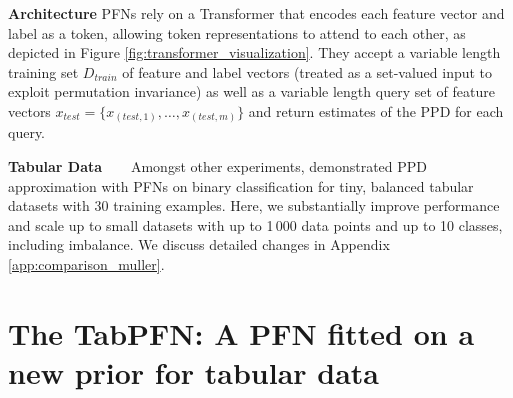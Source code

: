 \documentclass{article}
\newcommand{\slimparagraph}[1]{\textbf{#1~~~}}
\begin{document}
\textbf{Architecture} 
PFNs rely on a Transformer \citep{vaswani-neurips17a} that encodes each feature vector and label as a token, allowing token representations to attend to each other, as depicted in Figure \ref{fig:transformer_visualization}.
They accept a variable length training set $D_{train}$ of feature and label vectors (treated as a set-valued input to exploit permutation invariance) as well as a variable length query set of feature vectors $x_{test} = \{x_{({test},1)}, \dots, x_{({test},m)}\}$ and return estimates of the PPD for each query.

\slimparagraph{Tabular Data} Amongst other experiments, \cite{muller-iclr22a} demonstrated PPD approximation with PFNs on binary classification for tiny, balanced tabular datasets with $30$ training examples. Here, we substantially improve performance and scale up to small datasets with up to 1\,000 data points and up to 10 classes, including imbalance.
We discuss detailed changes in Appendix \ref{app:comparison_muller}.

\section{The TabPFN: A PFN fitted on a new prior for tabular data}\label{sec:tabpfn}
\end{document}
